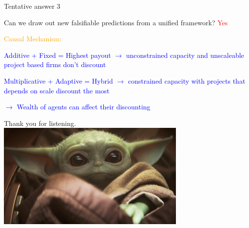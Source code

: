 \documentclass{beamer}
\numberwithin{equation}{section}
\begin{document}
\begin{frame}{Tentative answer 3}
\begin{itemize}
    \item Can we draw out new falsifiable predictions from a unified framework? \textcolor{red}{Yes}
    \item \textcolor{orange}{Causal Mechanism:} \textcolor{blue}{
    \item Additive + Fixed = Highest payout $\rightarrow$ unconstrained capacity and unscaleable project based firms don't discount
    \item Multiplicative + Adaptive = Hybrid $\rightarrow$ constrained capacity with projects that depends on scale discount the most
    \item $\rightarrow$ Wealth of agents can affect their discounting } 
\end{itemize}
\end{frame}


\begin{frame}
Thank you for listening.
\includegraphics[width=0.7\textwidth]{./figures/yoda.jpg} 
\end{frame}

\end{document}
